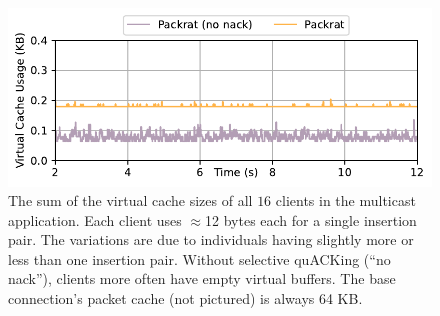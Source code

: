 \begin{figure}[t]
    \centering
    \includegraphics[width=0.8\linewidth]{packrat/figures/cache_multicast.pdf}
    \caption{The sum of the virtual cache sizes of all $16$ clients in
     the multicast application. Each client uses $\approx\!$12 bytes each for a
     single insertion pair. The variations are due to individuals having
     slightly more or less than one insertion pair. Without selective quACKing
     (``no nack''), clients more often have empty virtual buffers. The base
     connection's packet cache (not pictured) is always 64 KB.}
    \label{fig:packrat:memory:multicast}
\end{figure}